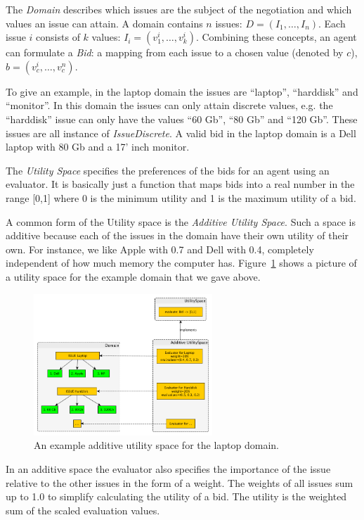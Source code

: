 \documentclass[]{article}
\begin{document}
The \textit{Domain} describes which issues are the subject of the negotiation and which values an issue can attain. A domain contains $n$ issues: $D=(I_1,\ldots,I_n)$. Each issue $i$ consists of $k$ values: $I_i=(v^i_1,\ldots,v^i_k)$.  Combining these concepts, an agent can formulate a \textit{Bid}: a mapping from each issue to a chosen value (denoted by $c$), $b=(v^i_{c},\ldots,v^n_{c})$. 

To give an example, in the laptop domain the issues are ``laptop'', ``harddisk'' and ``monitor''. In this domain the issues can only attain discrete values, e.g. the ``harddisk'' issue can only have the values ``60 Gb'', ``80 Gb'' and ``120 Gb''. These issues are all instance of \textit{IssueDiscrete}. A valid bid in the laptop domain is a Dell laptop with 80 Gb and a 17' inch monitor.

The \textit{Utility Space} specifies the preferences of the bids for an agent using an evaluator. It is basically just a function that maps bids into a real number in the range [0,1] where 0 is the minimum utility and 1 is the maximum utility of a bid.

A common form of the Utility space is the \textit{Additive Utility Space}. Such a space is additive because each of the issues in the domain have their own utility of their own. For instance, we like Apple with 0.7 and Dell with 0.4, completely independent of how much memory the computer has. Figure~\ref{Fig:utilspace} shows a picture of a utility space for the example domain that we gave above.

\begin{figure}[htb]
	\centering
	\includegraphics[width=0.6\textwidth]{media/utilspace.png}
	\caption{An example additive utility space for the laptop domain.}\label{Fig:utilspace}
\end{figure}
 
In an additive space the evaluator also specifies the importance of the issue relative to the other issues in the form of a weight. The weights of all issues sum up to 1.0 to simplify calculating the utility of a bid. The utility is the weighted sum of the scaled evaluation values.
\end{document}
